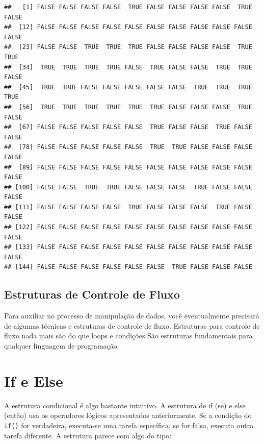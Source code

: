 \documentclass[]{book}
\newenvironment{Shaded}{\begin{snugshade}}{\end{snugshade}}
\newcommand{\KeywordTok}[1]{\textcolor[rgb]{0.13,0.29,0.53}{\textbf{#1}}}
\newcommand{\OperatorTok}[1]{\textcolor[rgb]{0.81,0.36,0.00}{\textbf{#1}}}
\newcommand{\NormalTok}[1]{#1}
\begin{document}
\begin{Shaded}
\end{Shaded}

\begin{verbatim}
##   [1] FALSE FALSE FALSE FALSE  TRUE FALSE FALSE FALSE FALSE  TRUE FALSE
##  [12] FALSE FALSE FALSE FALSE FALSE FALSE FALSE FALSE FALSE FALSE FALSE
##  [23] FALSE FALSE  TRUE  TRUE  TRUE FALSE FALSE FALSE FALSE  TRUE  TRUE
##  [34]  TRUE  TRUE  TRUE  TRUE FALSE  TRUE FALSE FALSE  TRUE  TRUE FALSE
##  [45]  TRUE  TRUE FALSE FALSE FALSE FALSE FALSE  TRUE  TRUE  TRUE  TRUE
##  [56]  TRUE  TRUE  TRUE  TRUE  TRUE  TRUE FALSE FALSE FALSE  TRUE FALSE
##  [67] FALSE FALSE FALSE FALSE FALSE  TRUE FALSE FALSE  TRUE FALSE FALSE
##  [78] FALSE FALSE FALSE FALSE FALSE  TRUE  TRUE FALSE FALSE FALSE FALSE
##  [89] FALSE FALSE FALSE FALSE FALSE FALSE FALSE FALSE FALSE FALSE FALSE
## [100] FALSE FALSE  TRUE  TRUE FALSE FALSE FALSE  TRUE FALSE FALSE FALSE
## [111] FALSE FALSE FALSE FALSE  TRUE FALSE FALSE FALSE  TRUE FALSE FALSE
## [122] FALSE FALSE FALSE FALSE FALSE FALSE FALSE FALSE FALSE FALSE FALSE
## [133] FALSE FALSE FALSE FALSE FALSE FALSE FALSE FALSE FALSE FALSE FALSE
## [144] FALSE FALSE FALSE FALSE FALSE FALSE  TRUE FALSE FALSE FALSE
\end{verbatim}

\subsection{Estruturas de Controle de
Fluxo}\label{estruturas-de-controle-de-fluxo}

Para auxiliar no processo de manipulação de dados, você eventualmente
precisará de algumas técnicas e estruturas de controle de fluxo.
Estruturas para controle de fluxo nada mais são do que loops e condições
São estruturas fundamentais para qualquer linguagem de programação.

\section{If e Else}\label{if-e-else}

A estrutura condicional é algo bastante intuitivo. A estrutura de if
(se) e else (então) usa os operadores lógicos apresentados
anteriormente. Se a condição do \texttt{if()} for verdadeira, executa-se
uma tarefa específica, se for falsa, executa outra tarefa diferente. A
estrutura parece com algo do tipo:
\end{document}
